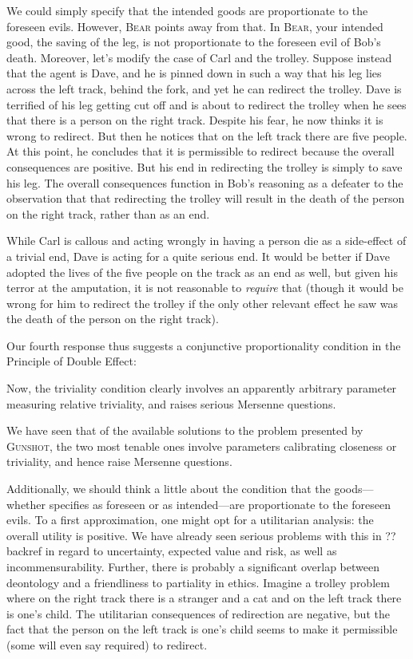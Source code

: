 We could simply specify that the intended goods are proportionate to the foreseen evils. However, \textsc{Bear} points away 
from that. In \textsc{Bear}, your intended good, the saving of the leg, is not proportionate to the foreseen evil of Bob's 
death. Moreover, let's modify the case of Carl and the trolley. Suppose instead that the agent is Dave, and he is pinned down
in such a way that his leg lies across the left track, behind the fork, and yet he can redirect the trolley. Dave is terrified
of his leg getting cut off and is about to redirect the trolley when he sees that there is a person on the right track. Despite
his fear, he now thinks it is wrong to redirect. But then he notices that on the left track there are five people. At this point,
he concludes that it is permissible to redirect because the overall consequences are positive. But his end in redirecting the
trolley is simply to save his leg. The overall consequences function in Bob's reasoning as a defeater to the 
observation that that redirecting the trolley will result in the death of the person on the right track, rather than as 
an end. 

While Carl is callous and acting wrongly in having a person die as a side-effect of a trivial end, Dave is acting for a quite
serious end. It would be better if Dave adopted the lives of the five people on the track as an end as well, but given his
terror at the amputation, it is not reasonable to \textit{require} that (though it would be wrong for him to redirect the
trolley if the only other relevant effect he saw was the death of the person on the right track).

Our fourth response thus suggests a conjunctive proportionality condition in the Principle of Double Effect:

Now, the triviality condition clearly involves an apparently arbitrary parameter measuring relative triviality, and raises serious 
Mersenne questions. 

We have seen that of the available solutions to the problem presented by \textsc{Gunshot}, the two most tenable ones involve 
parameters calibrating closeness or triviality, and hence raise Mersenne questions.

Additionally, we should think a little about the condition that the goods---whether specifies as foreseen or as intended---are 
proportionate to the foreseen evils. To a first approximation, one might opt for a utilitarian analysis: the overall
utility is positive. We have already seen serious problems with this in ??backref in regard to uncertainty, expected value
and risk, as well as incommensurability. Further, there is probably a significant overlap between deontology and a friendliness
to partiality in ethics. Imagine a trolley problem where on the right track there is a stranger and a cat and on the left track
there is one's child. The utilitarian consequences of redirection are negative, but the fact that the person on the left track
is one's child seems to make it permissible (some will even say required) to redirect. 

